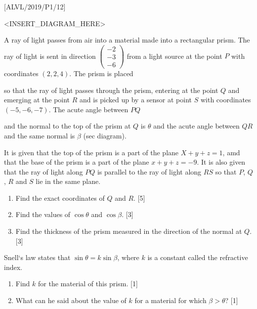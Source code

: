 \item {[}ALVL/2019/P1/12{]}
\noindent \begin{center}
\textless INSERT\_DIAGRAM\_HERE\textgreater{}
\par\end{center}

A ray of light passes from air into a material made into a rectangular
prism. The ray of light is sent in direction $\left(\begin{array}{c}
-2\\
-3\\
-6
\end{array}\right)$ from a light source at the point $P$ with coordinates $\left(2,2,4\right)$.
The prism is placed 

so that the ray of light passes through the prism, entering at the
point $Q$ and emerging at the point $R$ and is picked up by a sensor
at point $S$ with coordinates $\left(-5,-6,-7\right)$. The acute
angle between $PQ$

and the normal to the top of the prism at $Q$ is $\theta$ and the
acute angle between $QR$ and the same normal is $\beta$ (sec diagram).

It is given that the top of the prism is a part of the plane $X+y+z=1$,
amd that the base of the prism is a part of the plane $x+y+z=-9$.
It is also given that the ray of light along $PQ$ is parallel to
the ray of light along $RS$ so that $P$, $Q$, $R$ and $S$ lie
in the same plane.
\begin{enumerate}
\item Find the exact coordinates of $Q$ and $R$. {[}5{]}
\item Find the values of $\cos\theta$ and $\cos\beta$. {[}3{]} 
\item Find the thickness of the prism measured in the direction of the normal
at $Q$. {[}3{]}
\end{enumerate}
Snell\textquoteleft s law states that $\sin\theta=k\sin\beta$, where
$k$ is a constant called the refractive index. 
\begin{enumerate}
\item Find $k$ for the material of this prism. {[}1{]} 
\item What can he said about the value of $k$ for a material for which
$\beta>\theta$? {[}1{]}
\end{enumerate}
